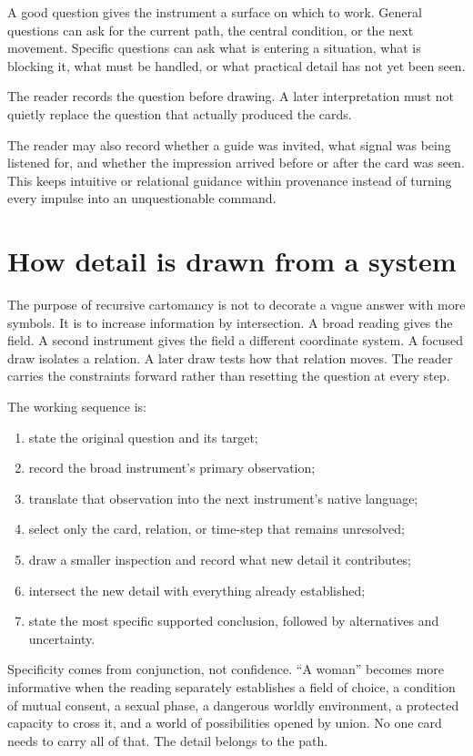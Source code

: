 A good question gives the instrument a surface on which to work. General
questions can ask for the current path, the central condition, or the next
movement. Specific questions can ask what is entering a situation, what is
blocking it, what must be handled, or what practical detail has not yet been
seen.

The reader records the question before drawing. A later interpretation must not
quietly replace the question that actually produced the cards.

The reader may also record whether a guide was invited, what signal was being
listened for, and whether the impression arrived before or after the card was
seen. This keeps intuitive or relational guidance within provenance instead of
turning every impulse into an unquestionable command.

\section{How detail is drawn from a system}

The purpose of recursive cartomancy is not to decorate a vague answer with more
symbols. It is to increase information by intersection. A broad reading gives
the field. A second instrument gives the field a different coordinate system.
A focused draw isolates a relation. A later draw tests how that relation moves.
The reader carries the constraints forward rather than resetting the question
at every step.

The working sequence is:

\begin{enumerate}
\item state the original question and its target;
\item record the broad instrument's primary observation;
\item translate that observation into the next instrument's native language;
\item select only the card, relation, or time-step that remains unresolved;
\item draw a smaller inspection and record what new detail it contributes;
\item intersect the new detail with everything already established;
\item state the most specific supported conclusion, followed by alternatives
      and uncertainty.
\end{enumerate}

Specificity comes from conjunction, not confidence. ``A woman'' becomes more
informative when the reading separately establishes a field of choice, a
condition of mutual consent, a sexual phase, a dangerous worldly environment,
a protected capacity to cross it, and a world of possibilities opened by union.
No one card needs to carry all of that. The detail belongs to the path.

